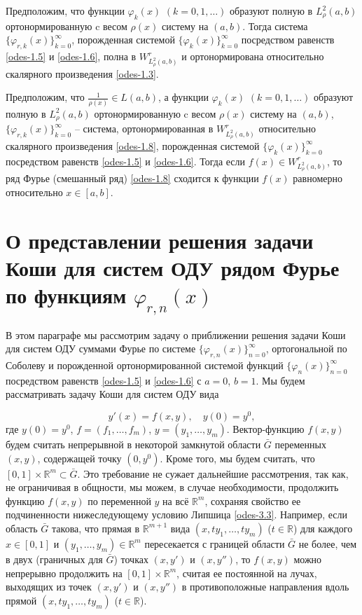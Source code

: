 \begin{theoremA}\label{odes-thA}
Предположим, что    функции $\varphi_k(x)$ $(k=0,1,\ldots)$ образуют полную в $L^2_\rho(a,b)$ ортонормированную   c весом   $\rho(x)$ систему на  $(a,b)$. Тогда система $\{\varphi_{r,k}(x)\}_{k=0}^\infty$, порожденная системой $\{\varphi_{k}(x)\}_{k=0}^\infty$ посредством равенств \eqref{odes-1.5} и \eqref{odes-1.6}, полна  в $W^r_{L^2_\rho(a,b)}$ и ортонормирована относительно скалярного произведения \eqref{odes-1.3}.
\end{theoremA}


\begin{theoremA}\label{odes-thB}
Предположим, что  $ \frac{1}{\rho(x)}\in L(a,b) $, а  функции $\varphi_k(x)$ $(k=0,1,\ldots)$  образуют полную в $L^2_\rho(a,b)$ ортонормированную   c весом   $\rho(x)$ систему на $(a,b)$, $\{\varphi_{r,k}(x)\}_{k=0}^\infty$ -- система, ортонормированная в $W^r_{L^2_\rho(a,b)}$ относительно скалярного произведения \eqref{odes-1.8},  порожденная системой $\{\varphi_{k}(x)\}_{k=0}^\infty$ посредством равенств \eqref{odes-1.5} и \eqref{odes-1.6}.
Тогда если $f(x)\in W^r_{L^2_\rho(a,b)}$, то ряд Фурье (смешанный ряд) \eqref{odes-1.8} сходится к функции $f(x)$ равномерно относительно $x\in[a,b]$.
\end{theoremA}




\section{О представлении решения задачи Коши для систем ОДУ рядом Фурье по функциям $\varphi_{r,n}(x)$}
В этом параграфе мы рассмотрим задачу о приближении решения задачи Коши для систем ОДУ  суммами  Фурье по системе $\{\varphi_{r,n}(x)\}_{n=0}^\infty$, ортогональной по Соболеву и порожденной ортонормированной системой функций $\{\varphi_{n}(x)\}_{n=0}^\infty$ посредством равенств \eqref{odes-1.5} и \eqref{odes-1.6} с $a=0$, $b=1$.
 Мы будем рассматривать задачу Коши для систем ОДУ вида

\begin{equation}\label{odes-3.1}
y'(x)=f(x,y), \quad y(0)=y^0,
\end{equation}
где $y(0)=y^0$,  $f=(f_1, \ldots, f_m)$, $y=(y_1, \ldots, y_m)$. Вектор-функцию   $f(x,y)$  будем считать непрерывной в некоторой замкнутой  области $\bar G$ переменных $(x,y)$, содержащей точку $(0,y^0)$. Кроме того, мы будем  считать, что  $[0,1]\times\mathbb{R}^m\subset\bar G$. Это требование не сужает дальнейшие рассмотрения, так как, не ограничивая в общности,  мы можем, в случае необходимости, продолжить функцию $f(x,y)$ по переменной $y$ на всё $\mathbb{R}^m$, сохраняя свойство ее подчиненности  нижеследующему условию Липшица \eqref{odes-3.3}. Например, если область $\bar G$ такова, что  прямая в $\mathbb{R}^{m+1}$ вида $(x,ty_1,\ldots,ty_m)$ ($t\in\mathbb{R}$) для каждого $x\in[0,1]$ и $(y_1,\ldots,y_m)\in\mathbb{R}^{m}$ пересекается с границей области $\bar G$ не более, чем в двух (граничных для $\bar G$) точках $(x,y')$ и $(x,y'')$, то  $f(x,y)$ можно непрерывно продолжить   на $[0,1]\times\mathbb{R}^m$, считая ее  постоянной на лучах, выходящих из точек  $(x,y')$ и $(x,y'')$ в противоположные направления вдоль прямой $(x,ty_1,\ldots,ty_m)$ ($t\in\mathbb{R}$).

